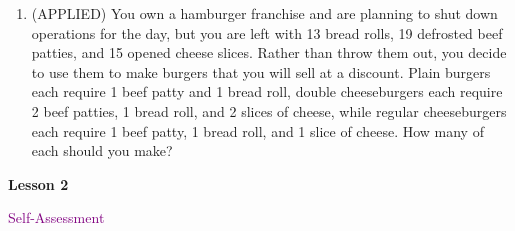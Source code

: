 \documentclass[10pt]{book}
\theoremstyle{definition}
\theoremstyle{remark}
\begin{document}
\begin{large}
\begin{enumerate}
\item (APPLIED) You own a hamburger franchise and are planning to shut down operations for the day, but you are left with 13 bread rolls, 19 defrosted beef patties, and 15 opened cheese slices. Rather than throw them out, you decide to use them to make burgers that you will sell at a discount. Plain burgers each require 1 beef patty and 1 bread roll, double cheeseburgers each require 2 beef patties, 1 bread roll, and 2 slices of cheese, while regular cheeseburgers each require 1 beef patty, 1 bread roll, and 1 slice of cheese. How many of each should you make?\vfil\vfil
\end{enumerate}
\end{large}
\newpage


\begin{tcolorbox}[
  width=\textwidth,
  colback=gray!10, %
  colframe=white, %
  boxrule=0pt,    %
  left=1cm,       %
  right=1cm,      %
  sharp corners  %
]

\begin{minipage}[t]{0.5\textwidth}
  \Huge \textbf{Lesson 2}
\end{minipage}%
\hfill
\begin{minipage}[t]{0.5\textwidth}
  \Huge\textcolor{purple}{Self-Assessment}
\end{minipage}
\end{tcolorbox}
\end{document}
